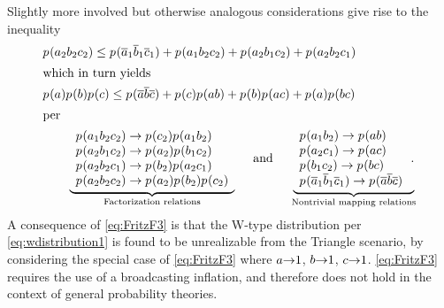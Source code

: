 {\bigskip
Slightly more involved but otherwise analogous considerations give rise to the inequality
\begin{align}\label{eq:trifancyunmapped}
  &  \p{a_2 b_2 c_2}\leq {\p{\n{a}_1 \n{b}_1 \n{c}_1} + \p{a_1 b_2 c_2} + \p{a_2 b_1 c_2} + \p{a_2 b_2 c_1}} \\
\shortintertext{which in turn yields}
\label{eq:FritzF3}
  & \p{a} \p{b} \p{c} \leq {\p{\n{a} \n{b} \n{c}} +\p{c}\p{a b}  + \p{b}\p{a c}  + \p{a} \p{b c}}\\
\shortintertext{per}
&\qquad
 \underbrace{\begin{array}{l}
 \p{a_1 b_2 c_2}\to \p{c_2} \p{a_1 b_2} \\
 \p{a_2 b_1 c_2}\to \p{a_2} \p{b_1 c_2} \\
 \p{a_2 b_2 c_1}\to \p{b_2} \p{a_2 c_1} \\
 \p{a_2 b_2 c_2}\to \p{a_2} \p{b_2} \p{c_2} \\
\end{array}}_{\text{Factorization relations}}   \quad \text{ and }\quad
\underbrace{\begin{array}{l}
\p{a_1 b_2} \to \p{a b} \\
\p{a_2 c_1} \to \p{a c} \\
\p{b_1 c_2} \to \p{b c} \\
\p{\n{a}_1 \n{b}_1 \n{c}_1}\to \p{\n{a} \n{b} \n{c}}  \\
\end{array}\,.}_{\text{Nontrivial mapping relations}}
\end{align}
A consequence of \cref{eq:FritzF3} is that the W-type distribution per \cref{eq:wdistribution1}
is found to be unrealizable from the Triangle scenario, by considering the special case of \cref{eq:FritzF3} where $a\mathord{\to}1$, $b\mathord{\to}1$, $c\mathord{\to}1$. \cref{eq:FritzF3} requires the use of a broadcasting inflation, and therefore does not hold in the context of general probability theories.

}
